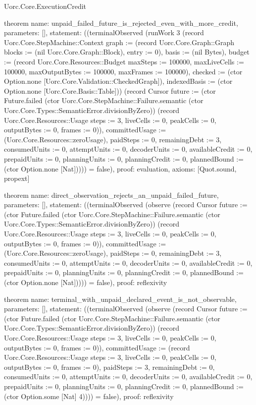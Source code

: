 \begin{lexlean}{Uorc.Core.ExecutionCredit}
\begin{semanticmodule}
theorem{
  name: unpaid_failed_future_is_rejected_even_with_more_credit,
  parameters: [],
  statement: ((terminalObserved (runWork 3 (record Uorc.Core.StepMachine::Context {graph := (record Uorc.Core.Graph::Graph {blocks := (nil Uorc.Core.Graph::Block), entry := 0}), basis := (nil Bytes), budget := (record Uorc.Core.Resources::Budget {maxSteps := 100000, maxLiveCells := 100000, maxOutputBytes := 100000, maxFrames := 100000}), checked := (ctor Option.none [Uorc.Core.Validation::CheckedGraph]), indexedBasis := (ctor Option.none [Uorc.Core.Basis::Table])}) (record Cursor {future := (ctor Future.failed (ctor Uorc.Core.StepMachine::Failure.semantic (ctor Uorc.Core.Types::SemanticError.divisionByZero)) (record Uorc.Core.Resources::Usage {steps := 3, liveCells := 0, peakCells := 0, outputBytes := 0, frames := 0})), committedUsage := (Uorc.Core.Resources::zeroUsage), paidSteps := 0, remainingDebt := 3, consumedUnits := 0, attemptUnits := 0, decoderUnits := 0, availableCredit := 0, prepaidUnits := 0, planningUnits := 0, planningCredit := 0, plannedBound := (ctor Option.none [Nat])}))) = false),
  proof: evaluation{},
  axioms: [Quot.sound, propext]
}

theorem{
  name: direct_observation_rejects_an_unpaid_failed_future,
  parameters: [],
  statement: ((terminalObserved (observe (record Cursor {future := (ctor Future.failed (ctor Uorc.Core.StepMachine::Failure.semantic (ctor Uorc.Core.Types::SemanticError.divisionByZero)) (record Uorc.Core.Resources::Usage {steps := 3, liveCells := 0, peakCells := 0, outputBytes := 0, frames := 0})), committedUsage := (Uorc.Core.Resources::zeroUsage), paidSteps := 0, remainingDebt := 3, consumedUnits := 0, attemptUnits := 0, decoderUnits := 0, availableCredit := 0, prepaidUnits := 0, planningUnits := 0, planningCredit := 0, plannedBound := (ctor Option.none [Nat])}))) = false),
  proof: reflexivity{}
}

theorem{
  name: terminal_with_unpaid_declared_event_is_not_observable,
  parameters: [],
  statement: ((terminalObserved (observe (record Cursor {future := (ctor Future.failed (ctor Uorc.Core.StepMachine::Failure.semantic (ctor Uorc.Core.Types::SemanticError.divisionByZero)) (record Uorc.Core.Resources::Usage {steps := 3, liveCells := 0, peakCells := 0, outputBytes := 0, frames := 0})), committedUsage := (record Uorc.Core.Resources::Usage {steps := 3, liveCells := 0, peakCells := 0, outputBytes := 0, frames := 0}), paidSteps := 3, remainingDebt := 0, consumedUnits := 0, attemptUnits := 0, decoderUnits := 0, availableCredit := 0, prepaidUnits := 0, planningUnits := 0, planningCredit := 0, plannedBound := (ctor Option.some [Nat] 4)}))) = false),
  proof: reflexivity{}
}
\end{semanticmodule}
\end{lexlean}
